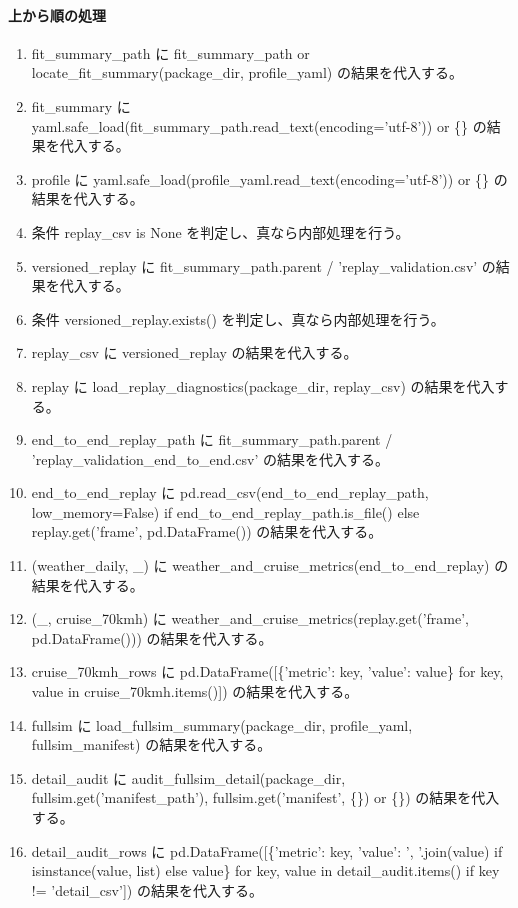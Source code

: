 \documentclass[a4paper,11pt]{article}
\begin{document}
            \paragraph{上から順の処理}
            \begin{enumerate}[leftmargin=1.8em]
            \item fit\_summary\_path に fit\_summary\_path or locate\_fit\_summary(package\_dir, profile\_yaml) の結果を代入する。
\item fit\_summary に yaml.safe\_load(fit\_summary\_path.read\_text(encoding='utf-8')) or \{\} の結果を代入する。
\item profile に yaml.safe\_load(profile\_yaml.read\_text(encoding='utf-8')) or \{\} の結果を代入する。
\item 条件 replay\_csv is None を判定し、真なら内部処理を行う。
\item   versioned\_replay に fit\_summary\_path.parent / 'replay\_validation.csv' の結果を代入する。
\item   条件 versioned\_replay.exists() を判定し、真なら内部処理を行う。
\item     replay\_csv に versioned\_replay の結果を代入する。
\item replay に load\_replay\_diagnostics(package\_dir, replay\_csv) の結果を代入する。
\item end\_to\_end\_replay\_path に fit\_summary\_path.parent / 'replay\_validation\_end\_to\_end.csv' の結果を代入する。
\item end\_to\_end\_replay に pd.read\_csv(end\_to\_end\_replay\_path, low\_memory=False) if end\_to\_end\_replay\_path.is\_file() else replay.get('frame', pd.DataFrame()) の結果を代入する。
\item (weather\_daily, \_) に weather\_and\_cruise\_metrics(end\_to\_end\_replay) の結果を代入する。
\item (\_, cruise\_70kmh) に weather\_and\_cruise\_metrics(replay.get('frame', pd.DataFrame())) の結果を代入する。
\item cruise\_70kmh\_rows に pd.DataFrame([\{'metric': key, 'value': value\} for key, value in cruise\_70kmh.items()]) の結果を代入する。
\item fullsim に load\_fullsim\_summary(package\_dir, profile\_yaml, fullsim\_manifest) の結果を代入する。
\item detail\_audit に audit\_fullsim\_detail(package\_dir, fullsim.get('manifest\_path'), fullsim.get('manifest', \{\}) or \{\}) の結果を代入する。
\item detail\_audit\_rows に pd.DataFrame([\{'metric': key, 'value': ', '.join(value) if isinstance(value, list) else value\} for key, value in detail\_audit.items() if key != 'detail\_csv']) の結果を代入する。

\end{enumerate}
\end{document}
